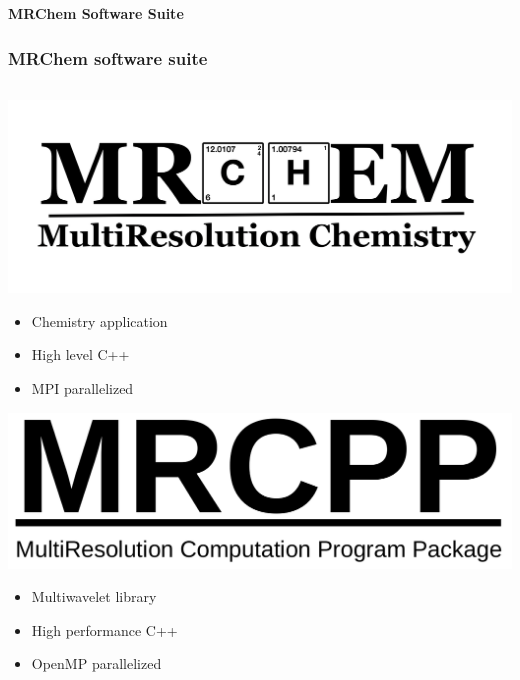 \begin{frame}
  \centering
  \textbf{\Large{MRChem Software Suite}}
\end{frame}

\begin{frame}
\frametitle{MRChem software suite}
\scriptsize

\begin{columns}
\begin{column}[b]{0.4\linewidth}
\centering
\includegraphics[scale=0.12]{figures/mrchem.png}
\begin{itemize}
    \item Chemistry application
    \item High level C++
    \item MPI parallelized
\end{itemize}

\vspace{10mm}

\includegraphics[scale=0.1]{figures/mrcpp.png}
\begin{itemize}
    \item Multiwavelet library
    \item High performance C++
    \item OpenMP parallelized
\end{itemize}
\end{column}


\end{columns}
\end{frame}
